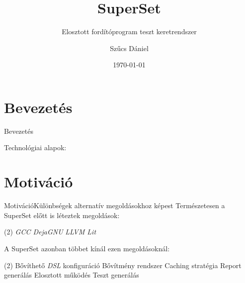 \documentclass[aspectratio=169,9pt]{beamer}
\title{SuperSet}
\subtitle{Elosztott fordítóprogram teszt keretrendszer}
\author[SzD]{Szűcs Dániel}
\institute{Szegedi Tudományegyetem}
\date{\today}
\begin{document}
\titleframe{}

\section{Bevezetés}
    \begin{frame}{Bevezetés}

        \vspace{12pt}
        Technológiai alapok:


    \end{frame}

\section{Motiváció}

    \begin{frame}{Motiváció}{Különbségek alternatív megoldásokhoz képest}
        Természetesen a \alert{SuperSet} előtt is léteztek megoldások:
        \begin{tasks} (2)
            \task{} \textit{GCC DejaGNU}
            \task{} \textit{LLVM Lit}
        \end{tasks}

        A \alert{SuperSet} azonban többet kínál ezen megoldásoknál:
        \begin{tasks} (2)
            \task{} Bővíthető \textit{DSL} konfiguráció
            \task{} Bővítmény rendszer
            \task{} Caching stratégia
            \task{} Report generálás
            \task{} Elosztott működés
            \task{} Teszt generálás
        \end{tasks}
    \end{frame}
\end{document}
